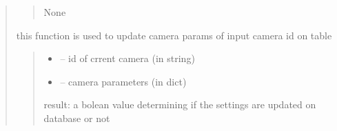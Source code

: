 \documentclass[letterpaper,10pt,english]{sphinxmanual}
\begin{document}
\begin{quote}
\begin{savenotes}
\begin{fulllineitems}
\begin{savenotes}
\begin{fulllineitems}
\begin{quote}
\begin{description}
\sphinxAtStartPar
None

\end{description}\end{quote}

\end{fulllineitems}\end{savenotes}


\begin{savenotes}\begin{fulllineitems}
\label{\detokenize{setting/database_utils:oxin.database_utils.dataBaseUtils.update_cam_params}}
\pysigstartsignatures
{}
\pysigstopsignatures
\sphinxAtStartPar
this function is used to update camera params of input camera id on table
\begin{quote}\begin{description}
\begin{itemize}
\item {} 
\sphinxAtStartPar
{} – id of crrent camera (in string)

\item {} 
\sphinxAtStartPar
{} – camera parameters (in dict)

\end{itemize}

\sphinxAtStartPar
result: a bolean value determining if the settings are updated on database or not

\end{description}\end{quote}

\end{fulllineitems}\end{savenotes}



\end{fulllineitems}
\end{savenotes}
\end{quote}
\end{document}
